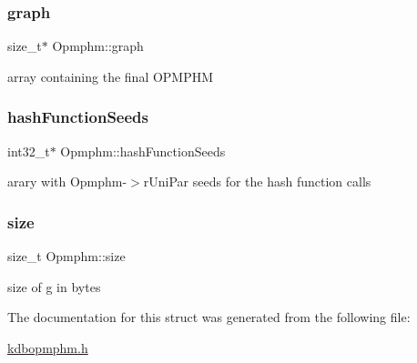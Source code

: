 \subsubsection{\texorpdfstring{graph}{graph}}
{\footnotesize\ttfamily size\+\_\+t$\ast$ Opmphm\+::graph}

array containing the final O\+P\+M\+P\+HM \mbox{\label{structOpmphm_a522b3ab16ceb22828b54333868c9324d}} 
\subsubsection{\texorpdfstring{hash\+Function\+Seeds}{hashFunctionSeeds}}
{\footnotesize\ttfamily int32\+\_\+t$\ast$ Opmphm\+::hash\+Function\+Seeds}

arary with Opmphm-\/$>$r\+Uni\+Par seeds for the hash function calls \mbox{\label{structOpmphm_a72e7343b4ea87b27891e760f03fd2b96}} 
\subsubsection{\texorpdfstring{size}{size}}
{\footnotesize\ttfamily size\+\_\+t Opmphm\+::size}

size of g in bytes 

The documentation for this struct was generated from the following file\+:\begin{DoxyCompactItemize}
\item 
\hyperlink{kdbopmphm_8h}{kdbopmphm.\+h}\end{DoxyCompactItemize}
